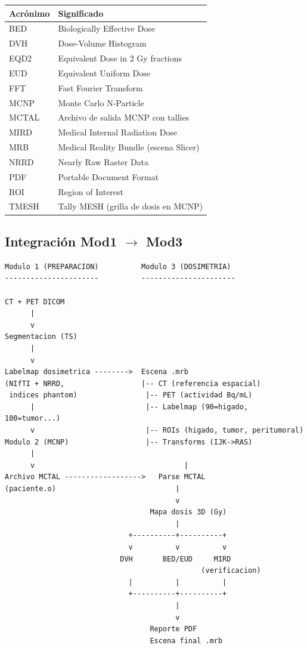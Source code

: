 \documentclass[12pt,a4paper]{article}
\begin{document}
\begin{tabular}{p{3cm} p{12cm}}
\toprule
\textbf{Acrónimo} & \textbf{Significado} \\
\midrule
BED & Biologically Effective Dose \\
DVH & Dose-Volume Histogram \\
EQD2 & Equivalent Dose in 2 Gy fractions \\
EUD & Equivalent Uniform Dose \\
FFT & Fast Fourier Transform \\
MCNP & Monte Carlo N-Particle \\
MCTAL & Archivo de salida MCNP con tallies \\
MIRD & Medical Internal Radiation Dose \\
MRB & Medical Reality Bundle (escena Slicer) \\
NRRD & Nearly Raw Raster Data \\
PDF & Portable Document Format \\
ROI & Region of Interest \\
TMESH & Tally MESH (grilla de dosis en MCNP) \\
\bottomrule
\end{tabular}

\subsection{Integración Mod1 $\to$ Mod3}

\begin{verbatim}
Modulo 1 (PREPARACION)          Modulo 3 (DOSIMETRIA)
----------------------          ----------------------

CT + PET DICOM
      |
      v
Segmentacion (TS)
      |
      v
Labelmap dosimetrica -------->  Escena .mrb
(NIfTI + NRRD,                  |-- CT (referencia espacial)
 indices phantom)                |-- PET (actividad Bq/mL)
      |                          |-- Labelmap (90=higado, 100=tumor...)
      v                          |-- ROIs (higado, tumor, peritumoral)
Modulo 2 (MCNP)                  |-- Transforms (IJK->RAS)
      |
      v                                   |
Archivo MCTAL ------------------>   Parse MCTAL
(paciente.o)                            |
                                        v
                                  Mapa dosis 3D (Gy)
                                        |
                             +----------+----------+
                             v          v          v
                           DVH       BED/EUD     MIRD
                                              (verificacion)
                             |          |          |
                             +----------+----------+
                                        |
                                        v
                                  Reporte PDF
                                  Escena final .mrb
\end{verbatim}
\end{document}
